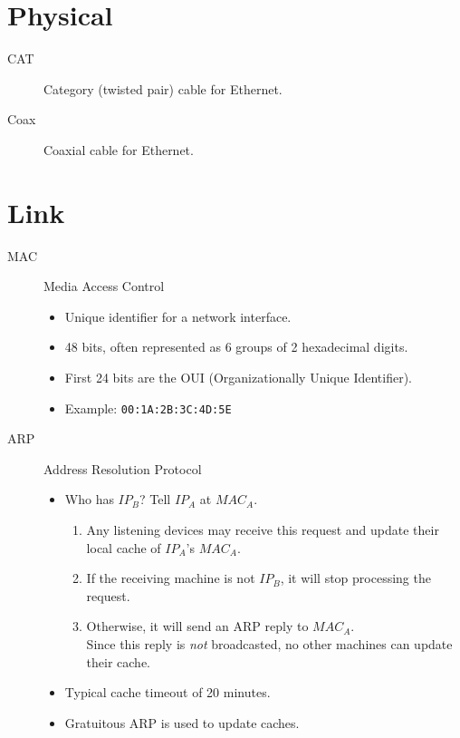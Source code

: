 \documentclass[8pt]{extarticle}
\begin{document}
\section*{Physical}
\begin{description}
  \item[CAT] Category (twisted pair) cable for Ethernet.
  \item[Coax] Coaxial cable for Ethernet.
\end{description}

\section*{Link}
\begin{description}
  \item[MAC] Media Access Control
        \begin{itemize}
          \item Unique identifier for a network interface.
          \item 48 bits, often represented as 6 groups of 2 hexadecimal digits.
          \item First 24 bits are the OUI (Organizationally Unique Identifier).
          \item Example: \texttt{00:1A:2B:3C:4D:5E}
        \end{itemize}
  \item[ARP] Address Resolution Protocol
        \begin{itemize}
          \item Who has \texttt{$IP_B$}? Tell \texttt{$IP_A$} at \texttt{$MAC_A$}.
                \begin{enumerate}
                  \item Any listening devices may receive this request and update their
                        local cache of $IP_A$'s $MAC_A$.
                  \item If the receiving machine is not $IP_B$, it will stop processing
                        the request.
                  \item Otherwise, it will send an ARP reply to $MAC_A$. \\
                        Since this reply is \emph{not} broadcasted, no other machines can update their cache.
                \end{enumerate}
          \item Typical cache timeout of 20 minutes.
          \item Gratuitous ARP is used to update caches.

\end{itemize}
\end{description}
\end{document}
